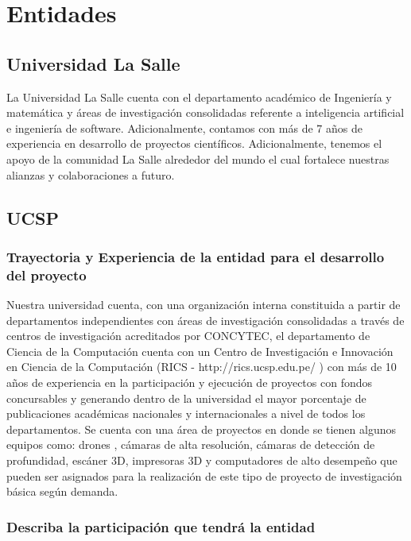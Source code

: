 \documentclass[a4paper,11pt]{article}
\begin{document}
\section{Entidades}

\subsection{Universidad La Salle}
La Universidad La Salle cuenta con el departamento académico de Ingeniería y matemática y áreas de investigación consolidadas referente a inteligencia artificial e ingeniería de software. Adicionalmente, contamos con más de 7 años de experiencia en desarrollo de proyectos científicos. Adicionalmente, tenemos el apoyo de la comunidad La Salle alrededor del mundo el cual fortalece nuestras alianzas y colaboraciones a futuro. 

\subsection{UCSP}

\subsubsection{Trayectoria y Experiencia de la entidad para el desarrollo del proyecto}

Nuestra universidad cuenta, con una organización interna constituida a partir de departamentos independientes con áreas de investigación consolidadas a través de centros de investigación acreditados por CONCYTEC, el departamento de Ciencia de la Computación cuenta con un Centro de Investigación e Innovación en Ciencia de la Computación (RICS -
http://rics.ucsp.edu.pe/ ) con más de 10 años de experiencia en la participación y ejecución de proyectos con fondos concursables y generando dentro de la universidad el mayor porcentaje de publicaciones académicas nacionales y internacionales a nivel de todos los departamentos. Se cuenta con una área de proyectos en donde se tienen algunos equipos como: drones ,
cámaras de alta resolución, cámaras de detección de profundidad, escáner 3D, impresoras 3D y computadores de alto desempeño que pueden ser asignados para la realización de este tipo de proyecto de investigación básica según demanda.

\subsubsection{Describa la participación que tendrá la entidad}
\end{document}
